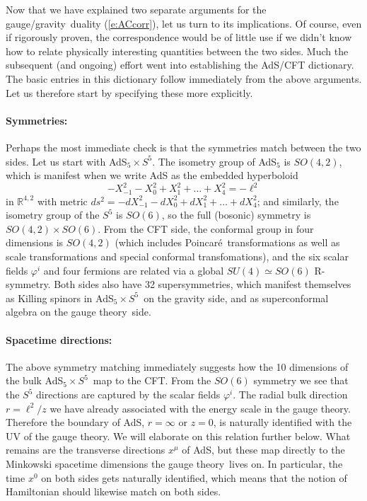 \documentclass[12pt,a4paper]{article}
\def\req#1{(\ref{#1})}
\def\GG{gauge/gravity}
\def\GT{gauge theory}
\def\Poinc{Poincar\' e}
\def\RR{\mathbb{R}}
\def\adss#1#2{AdS$_{#1} \times S^{#2}$}
\def\Rads{\ell}
\def\ph{\varphi}
\begin{document}
Now that we have explained two separate arguments for the \GG\ duality \req{e:ACcorr}, let us turn to its implications.  Of course, even if rigorously proven, the correspondence would be of little use if we didn't know how to relate physically interesting quantities between the two sides.  Much the subsequent (and ongoing) effort went into establishing the AdS/CFT dictionary. 
The basic entries in this dictionary follow immediately from the above arguments.  Let us therefore start by specifying these more explicitly.

\paragraph{Symmetries:}  %
Perhaps the most immediate check is that the symmetries match between the two sides.
Let us start with \adss55.  The isometry group of AdS$_5$ is $SO(4,2)$, which is manifest when we write AdS as the embedded hyperboloid
%
\begin{equation}
-X_{-1}^2 - X_{0}^2 + X_{1}^2 + 
 \ldots  
+ X_{4}^2= - \Rads^2
\label{}
\end{equation}	
%
in $\RR^{4,2}$ with metric
$ds^2 = -dX_{-1}^2 - dX_{0}^2 + dX_{1}^2 + \ldots + dX_{4}^2 $; and similarly, the isometry group of the $S^5$ is $SO(6)$, so the full
(bosonic) symmetry is $SO(4,2) \times SO(6)$.
From the CFT side, the conformal group in four dimensions is $SO(4, 2)$ (which includes \Poinc\ transformations as well as scale transformations and special conformal transfomations), and the six scalar fields $\ph^i$ and four fermions are related via a global $SU(4) \simeq SO(6)$ R-symmetry.  Both sides also have 32 supersymmetries, which manifest themselves as Killing spinors in  \adss55\ on the gravity side, and as superconformal algebra on the \GT\ side.

\paragraph{Spacetime directions:}  %
The above symmetry matching immediately suggests how the 10 dimensions of the bulk \adss55\ map to the CFT.  From the $SO(6)$ symmetry we see that the $S^5$ directions  are captured by the scalar fields $\ph^i$.   The radial bulk direction $r = \Rads^2/z$ we have already  associated with the energy scale in the \GT.  
Therefore the boundary of AdS, $r=\infty$ or $z=0$, is naturally identified with the UV of the \GT.  We will elaborate on this relation further below.
What remains are the transverse directions $x^\mu$ of AdS, but these map directly to the Minkowski spacetime dimensions the \GT\ lives on.
In particular, the time $x^0$ on both sides gets naturally identified, which means that the notion of Hamiltonian should likewise match on both sides.
\end{document}
